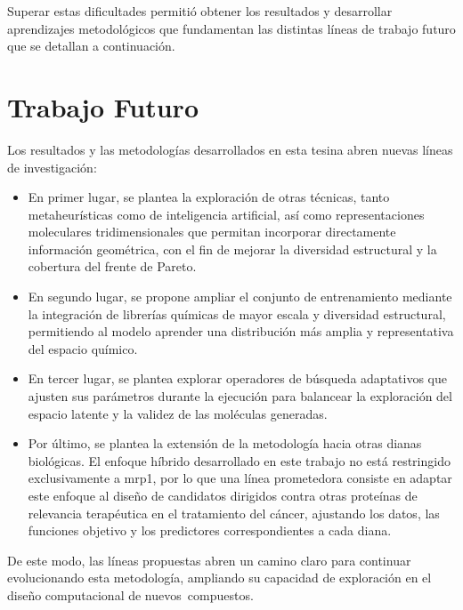 Superar estas dificultades permitió obtener los resultados y desarrollar aprendizajes metodológicos que fundamentan las distintas líneas de trabajo futuro que se detallan a continuación.

\section{Trabajo Futuro}
\label{sec:trabajo_futuro}

Los resultados y las metodologías desarrollados en esta tesina abren nuevas líneas de investigación:

\begin{itemize}
    \item En primer lugar, se plantea la exploración de otras técnicas, tanto metaheurísticas como de inteligencia artificial, así como representaciones moleculares tridimensionales que permitan incorporar directamente información geométrica, con el fin de mejorar la diversidad estructural y la cobertura del frente de Pareto.

    \item En segundo lugar, se propone ampliar el conjunto de entrenamiento mediante la integración de librerías químicas de mayor escala y diversidad estructural, permitiendo al modelo aprender una distribución más amplia y representativa del espacio químico.

    \item En tercer lugar, se plantea explorar operadores de búsqueda adaptativos que ajusten sus parámetros durante la ejecución para balancear la exploración del espacio latente y la validez de las moléculas generadas.

    \item Por último, se plantea la extensión de la metodología hacia otras dianas biológicas. El enfoque híbrido desarrollado en este trabajo no está restringido exclusivamente a \gls{mrp1}, por lo que una línea prometedora consiste en adaptar este enfoque al diseño de candidatos dirigidos contra otras proteínas de relevancia terapéutica en el tratamiento del cáncer, ajustando los datos, las funciones objetivo y los predictores correspondientes a cada diana.
\end{itemize}

De este modo, las líneas propuestas abren un camino claro para continuar evolucionando esta metodología, ampliando su capacidad de exploración en el diseño computacional de nuevos~compuestos.
